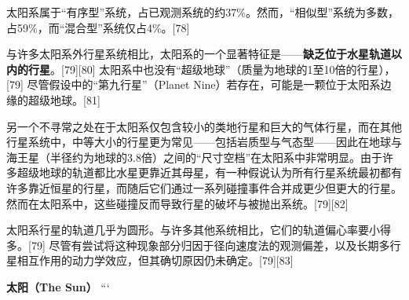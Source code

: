 太阳系属于“有序型”系统，占已观测系统的约37\%。然而，“相似型”系统为多数，占59\%，而“混合型”系统仅占4\%。[78]

与许多太阳系外行星系统相比，太阳系的一个显著特征是——\textbf{缺乏位于水星轨道以内的行星}。[79][80]  
太阳系中也没有“超级地球”（质量为地球的1至10倍的行星），[79] 尽管假设中的“第九行星”（Planet Nine）若存在，可能是一颗位于太阳系边缘的超级地球。[81]

另一个不寻常之处在于太阳系仅包含较小的类地行星和巨大的气体行星，而在其他行星系统中，中等大小的行星更为常见——包括岩质型与气态型——因此在地球与海王星（半径约为地球的3.8倍）之间的“尺寸空档”在太阳系中非常明显。由于许多超级地球的轨道都比水星更靠近其母星，有一种假说认为所有行星系统最初都有许多靠近恒星的行星，而随后它们通过一系列碰撞事件合并成更少但更大的行星。然而在太阳系中，这些碰撞反而导致行星的破坏与被抛出系统。[79][82]

太阳系行星的轨道几乎为圆形。与许多其他系统相比，它们的轨道偏心率要小得多。[79] 尽管有尝试将这种现象部分归因于径向速度法的观测偏差，以及长期多行星相互作用的动力学效应，但其确切原因仍未确定。[79][83]

\textbf{太阳（The Sun）}
```


